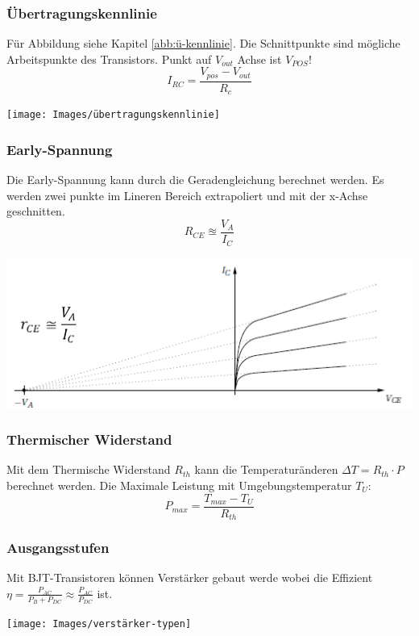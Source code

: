 \subsubsection{Übertragungskennlinie}
Für Abbildung siehe Kapitel \ref{abb:ü-kennlinie}. Die Schnittpunkte sind mögliche Arbeitspunkte des Transistors. Punkt auf $V_{out}$ Achse ist \underline{$V_{POS}$}!
\[
I_{RC} = \frac{V_{pos} - V_{out}}{R_c}
\]
\begin{center}
	\texttt{[image: Images/übertragungskennlinie]}
\end{center}


\subsubsection{Early-Spannung}
Die Early-Spannung kann durch die Geradengleichung berechnet werden. Es werden zwei punkte im Lineren Bereich extrapoliert und mit der x-Achse geschnitten.
\[
R_{CE} \approxeq \frac{V_A}{I_C}
\]
\begin{center}
	\includegraphics[width=0.7\columnwidth]{Images/early-spannung}
\end{center}

\subsubsection{Thermischer Widerstand}
Mit dem Thermische Widerstand $R_{th}$ kann die Temperaturänderen $\Delta T = R_{th} \cdot P$ berechnet werden. Die Maximale Leistung mit Umgebungstemperatur $T_{U}$: \[P_{max} = \frac{T_{max} - T_U}{R_{th}}\]

\subsubsection{Ausgangsstufen}
Mit BJT-Transistoren können Verstärker gebaut werde wobei die Effizient $\eta = \frac{P_{AC}}{P_B + P_{DC}} \approx \frac{P_{AC}}{P_{DC}}$ ist.
\begin{center}
	\texttt{[image: Images/verstärker-typen]}
\end{center}

